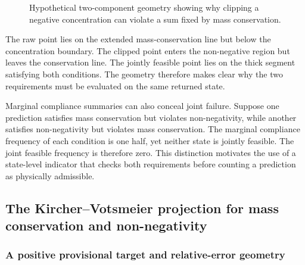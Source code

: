 \begin{figure}[htbp]
\centering
{}
\caption{Hypothetical two-component geometry showing why clipping a negative concentration can violate a sum fixed by mass conservation.}
\label{fig:assessment_feasible_segment}
\end{figure}

The raw point lies on the extended mass-conservation line but below the concentration boundary. The clipped point enters the non-negative region but leaves the conservation line. The jointly feasible point lies on the thick segment satisfying both conditions. The geometry therefore makes clear why the two requirements must be evaluated on the same returned state.

Marginal compliance summaries can also conceal joint failure. Suppose one prediction satisfies mass conservation but violates non-negativity, while another satisfies non-negativity but violates mass conservation. The marginal compliance frequency of each condition is one half, yet neither state is jointly feasible. The joint feasible frequency is therefore zero. This distinction motivates the use of a state-level indicator that checks both requirements before counting a prediction as physically admissible.

\subsection{The Kircher--Votsmeier projection for mass conservation and non-negativity}

\subsubsection{A positive provisional target and relative-error geometry}

